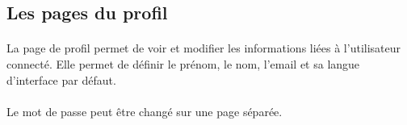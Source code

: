 \subsection{Les pages du profil}
\label{subsec:profile-page}

\paragraph{}
La page de profil permet de voir et modifier les informations liées à l'utilisateur connecté.
Elle permet de définir le prénom, le nom, l'email et sa langue d'interface par défaut.

\paragraph{}
Le mot de passe peut être changé sur une page séparée.
